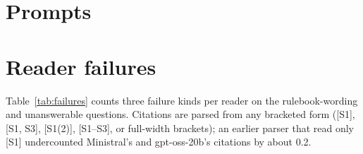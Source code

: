 \documentclass[11pt]{article}
\begin{document}


\appendix
\section{Prompts}\label{app:prompts}


\section{Reader failures}\label{app:failures}
Table~\ref{tab:failures} counts three failure kinds per reader on the rulebook-wording and unanswerable questions. Citations are parsed from any bracketed form ([S1], [S1, S3], [S1(2)], [S1--S3], or full-width brackets); an earlier parser that read only [S1] undercounted Ministral's and gpt-oss-20b's citations by about 0.2.

\end{document}
